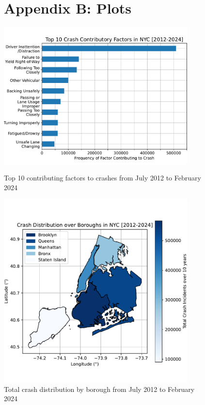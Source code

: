 \documentclass[runningheads]{llncs}
\begin{document}
\begin{figure}
    \section{Appendix B: Plots}
\center
\includegraphics[width=10cm]{top10factors.pdf}
\caption{Top 10 contributing factors to crashes from July 2012 to February 2024}

\includegraphics[width=10cm]{boroughsdistr.pdf}
\caption{Total crash distribution by borough from July 2012 to February 2024}
\end{figure}
\end{document}
